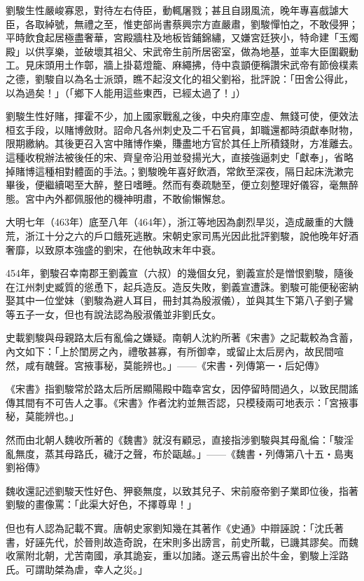 劉駿生性嚴峻寡恩，對待左右侍臣，動輒屠戮；甚且自詡風流，晚年專喜戲謔大臣，各取綽號，無禮之至，惟吏部尚書蔡興宗方直嚴肅，劉駿憚怕之，不敢侵狎；平時飲食起居極盡奢華，宮殿牆柱及地板皆鋪錦繡，又嫌宮廷狹小，特命建「玉燭殿」以供享樂，並破壞其祖父、宋武帝生前所居密室，做為地基，並率大臣圍觀動工。見床頭用土作鄣，牆上掛葛燈籠、麻繩拂，侍中袁顗便稱讚宋武帝有節儉樸素之德，劉駿自以為名士派頭，瞧不起沒文化的祖父劉裕，批評說：「田舍公得此，以為過矣！」（「鄉下人能用這些東西，已經太過了！」）

劉駿生性好賭，揮霍不少，加上國家戰亂之後，中央府庫空虛、無錢可使，便效法桓玄手段，以賭博斂財。詔命凡各州刺史及二千石官員，卸職還都時須獻奉財物，限期繳納。其後更召入宮中賭博作樂，賺盡地方官於其任上所積錢財，方准離去。這種收稅辦法被後任的宋、齊皇帝沿用並發揚光大，直接強逼刺史「獻奉」，省略掉賭博這種相對體面的手法。；劉駿晚年喜好飲酒，常飲至深夜，隔日起床洗漱完畢後，便繼續喝至大醉，整日嗜睡。然而有奏疏馳至，便立刻整理好儀容，毫無醉態。宮中內外都佩服他的機神明肅，不敢偷懶懈怠。

大明七年（463年）底至八年（464年），浙江等地因為劇烈旱災，造成嚴重的大饑荒，浙江十分之六的戶口餓死逃散。宋朝史家司馬光因此批評劉駿，說他晚年好酒奢靡，以致原本強盛的劉宋，在他執政末年中衰。

454年，劉駿召幸南郡王劉義宣（六叔）的幾個女兒，劉義宣於是憎恨劉駿，隨後在江州刺史臧質的慫恿下，起兵造反。造反失敗，劉義宣遭誅。劉駿可能便秘密納娶其中一位堂妹（劉駿為避人耳目，冊封其為殷淑儀），並與其生下第八子劉子鸞等五子一女，但也有說法認為殷淑儀並非劉氏女。

史載劉駿與母親路太后有亂倫之嫌疑。南朝人沈約所著《宋書》之記載較為含蓄，內文如下：「上於閨房之內，禮敬甚寡，有所御幸，或留止太后房內，故民間喧然，咸有醜聲。宮掖事秘，莫能辨也。」——《宋書‧列傳第一‧后妃傳》

《宋書》指劉駿常於路太后所居顯陽殿中臨幸宮女，因停留時間過久，以致民間謠傳其間有不可告人之事。《宋書》作者沈約並無否認，只模稜兩可地表示：「宮掖事秘，莫能辨也。」

然而由北朝人魏收所著的《魏書》就沒有顧忌，直接指涉劉駿與其母亂倫：「駿淫亂無度，蒸其母路氏，穢汙之聲，布於甌越。」——《魏書‧列傳第八十五‧島夷劉裕傳》

魏收還記述劉駿天性好色、狎褻無度，以致其兒子、宋前廢帝劉子業即位後，指著劉駿的畫像罵：「此渠大好色，不擇尊卑！」

但也有人認為記載不實。唐朝史家劉知幾在其著作《史通》中辯誣說：「沈氏著書，好誣先代，於晉則故造奇說，在宋則多出謗言，前史所載，已譏其謬矣。而魏收黨附北朝，尤苦南國，承其詭妄，重以加諸。遂云馬睿出於牛金，劉駿上淫路氏。可謂助桀為虐，幸人之災。」

